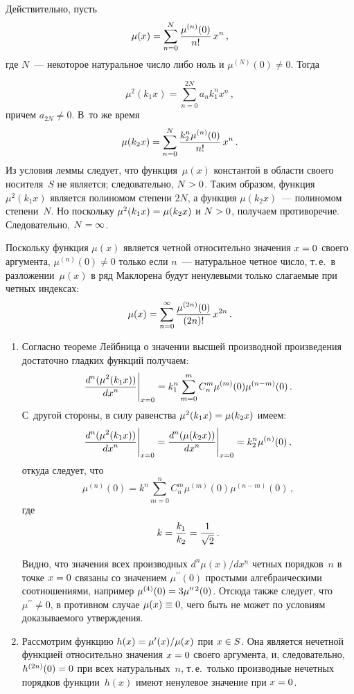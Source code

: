 \begin{multicols}{2}
{  Действительно, пусть 
  $$
  \mu(x)=\sum\limits_{n=0}^N \displaystyle\frac{\displaystyle \mu^{(n)}(0)\mathstrut}{\displaystyle n!\mathstrut}\, 
x^n\,,
$$
где $N$~--- некоторое натуральное число либо ноль и 
$\mu^{(N)}(0)\not=0$. Тогда 

\noindent
$$
\mu^2(k_1 x) = \sum\limits_{n=0}^{2N} 
a_n k_1^n x^n\,,
$$
причем $a_{2N}\not=0$. В~то же время 
$$\mu(k_2 x)  =\sum\limits_{n=0}^N \displaystyle\frac{\displaystyle k_2^n\mu^{(n)}(0)\mathstrut}{\displaystyle n!\mathstrut}\,x^n\,.$$ 
Из условия леммы 
следует, что функция~$\mu(x)$ константой в области своего носителя~$S$ не 
является; следовательно, $N\hm>0$. Таким образом, функция $\mu^2(k_1 
x)$ является полиномом степени $2N$, а функция $\mu(k_2 x)$~--- 
полиномом степени~$N$. Но поскольку $\mu^2(k_1 x)\hm=\mu(k_2 x)$ 
и $N\hm>0$, получаем противоречие. Следовательно, $N\hm=\infty$. 
  
  Поскольку функция $\mu(x)$ является четной относительно значения 
$x\hm=0$ своего аргумента, $\mu^{(n)}(0)\not=0$ только если $n$~--- 
натуральное четное число, т.\,е.\ в разложении~$\mu(x)$ в ряд Маклорена будут 
ненулевыми только слагаемые при четных индексах: 
$$
\mu(x)= \sum\limits_{n=0}^\infty \displaystyle\frac{\displaystyle \mu^{(2n)}(0)\mathstrut}{\displaystyle (2n)!\mathstrut}\,x^{2n}\,.
$$
  \begin{enumerate}[1.]
  \item Согласно теореме Лейбница о значении высшей производной 
произведения достаточно гладких функций получаем:
  \begin{equation*}
  \displaystyle\frac{\displaystyle d^n(\mu^2(k_1 x))\mathstrut}{\displaystyle dx^n\mathstrut}\Bigg\vert_{x=0}=
k_1^n\sum\limits_{m=0}^m 
C_n^m \mu^{(m)}(0) \mu^{(n-m)}(0)\,.
  \end{equation*} 
  С~другой стороны, в силу равенства $\mu^2(k_1 x)\hm= \mu(k_2 x)$ 
имеем: 
  \begin{equation*}
  \displaystyle\frac{\displaystyle d^n(\mu^2(k_1 x))\mathstrut}{\displaystyle dx^n\mathstrut}\Bigg\vert_{x=0}=\displaystyle\frac{\displaystyle d^n(\mu(k_2 
x))\mathstrut}{\displaystyle dx^n\mathstrut}\Bigg\vert_{x=0}=
k_2^n \mu^{(n)}(0)\,,
  \end{equation*} 
  откуда следует, что 
  \begin{equation}
  \mu^{(n)}(0)=k^n\sum\limits_{m=0}^n C_n^m \mu^{(m)}(0)\mu^{(n-
m)}(0)\,,
  \label{e2sem}
\end{equation}
где
$$
  k=\displaystyle\frac{\displaystyle k_1\mathstrut}{\displaystyle k_2\mathstrut}=\displaystyle\frac{\displaystyle 1\mathstrut}{\displaystyle \sqrt{2}\mathstrut}\,.
  $$
  
  Видно, что значения всех производных $d^n\mu(x)/dx^n$ четных 
порядков~$n$ в точке $x\hm=0$ связаны со значением $\mu^{\prime\prime}(0)$ 
простыми алгебраическими соотношениями, например $\mu^{(4)}(0)\hm= 
3\mu^{\prime\prime\,2}(0)$. Отсюда также следует, что 
$\mu^{\prime\prime}\not=0$, в противном случае $\mu(x)\hm\equiv 0$, чего быть 
не может по условиям доказываемого утверждения.
  \item  Рассмотрим функцию $h(x)\hm= \mu^\prime(x)/\mu(x)$ при $x\hm\in S$. 
Она является нечетной функцией относительно значения $x\hm=0$ своего 
аргумента, и, следовательно, $h^{(2n)}(0)\hm=0$ при всех натуральных~$n$, 
т.\,е.\ только производные нечетных порядков функции~$h(x)$ имеют 
ненулевое значение при $x\hm=0$.
  

\end{enumerate}}
\end{multicols}
